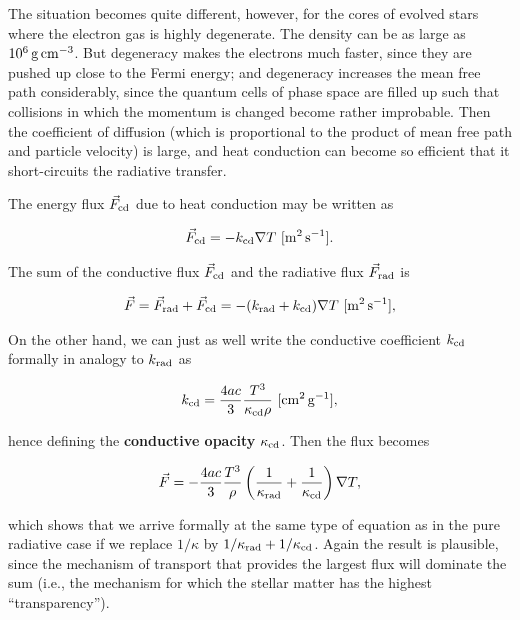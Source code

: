 \documentclass[a4paper,10pt]{article}
\begin{document}
{\noindent}The situation becomes quite different, however, for the cores of evolved stars where the electron gas is highly degenerate. The density can be as large as $10^6\,{\rm g\,cm^{-3}}$. But degeneracy makes the electrons much faster, since they are pushed up close to the Fermi energy; and degeneracy increases the mean free path considerably, since the quantum cells of phase space are filled up such that collisions in which the momentum is changed become rather improbable. Then the coefficient of diffusion (which is proportional to the product of mean free path and particle velocity) is large, and heat conduction can become so efficient that it short-circuits the radiative transfer.

{\noindent}The energy flux $\vec{F}_{\rm cd}$ due to heat conduction may be written as

\begin{align*}
    \vec{F}_{\rm cd} = -k_{\rm cd}\nabla T ~ [{\rm m^2\,s^{-1}}].
\end{align*}

{\noindent}The sum of the conductive flux $\vec{F}_{\rm cd}$ and the radiative flux $\vec{F}_{\rm rad}$ is

\begin{align*}
    \vec{F} = \vec{F}_{\rm rad}+\vec{F}_{\rm cd} = -(k_{\rm rad}+k_{\rm cd})\nabla T ~ [{\rm m^2\,s^{-1}}],
\end{align*}

{\noindent}On the other hand, we can just as well write the conductive coefficient $k_{\rm cd}$ formally in analogy to $k_{\rm rad}$ as

\begin{align*}
    k_{\rm cd} = \frac{4ac}{3}\frac{T^3}{\kappa_{\rm cd}\rho} ~ [{\rm cm^2\,g^{-1}}],
\end{align*}

{\noindent}hence defining the \textbf{conductive opacity} $\kappa_{\rm cd}$. Then the flux becomes

\begin{align*}
    \vec{F} = -\frac{4ac}{3}\frac{T^3}{\rho} \left(\frac{1}{\kappa_{\rm rad}}+\frac{1}{\kappa_{\rm cd}}\right) \nabla T,
\end{align*}

{\noindent}which shows that we arrive formally at the same type of equation as in the pure radiative case if we replace $1/\kappa$ by $1/\kappa_{\rm rad}+1/\kappa_{\rm cd}$. Again the result is plausible, since the mechanism of transport that provides the largest flux will dominate the sum (i.e., the mechanism for which the stellar matter has the highest ``transparency'').
\end{document}
